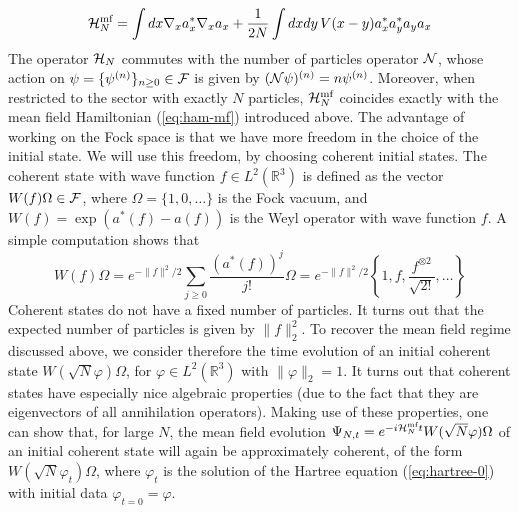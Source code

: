 \documentclass[11pt,a4paper]{article}
\newcommand{\bR}{{\mathbb R}}
\newcommand{\cF}{{\cal F}}
\newcommand{\cH}{{\cal H}}
\newcommand{\cN}{{\cal N}}
\begin{document}
\[ \cH^{\text{mf}}_N = \int dx \nabla_x a_x^* \nabla_x a_x + \frac{1}{2N} \int dxdy \, V(x-y) a_x^* a_y^*a_y a_x \]
The operator $\cH_N$ commutes with the number of particles operator $\cN$, whose action on $\psi = \{ \psi^{(n)} \}_{n\geq 0} \in \cF$ is given by $(\cN \psi)^{(n)} = n \psi^{(n)}$. Moreover, when restricted to the sector with exactly $N$ particles, $\cH^{\text{mf}}_N$ coincides exactly with the mean field Hamiltonian (\ref{eq:ham-mf}) introduced above. The advantage of working on the Fock space is that we have more freedom in the choice of the initial state. We will use this freedom, by choosing coherent initial states. The coherent state with wave function $f \in L^2 (\bR^3)$ is defined as the vector $W(f) \Omega \in \cF$, where $\Omega = \{ 1, 0, \dots \}$ is the Fock vacuum, and $W(f)= \exp (a^* (f) - a(f))$ is the Weyl operator with wave function $f$.  A simple computation shows that
\[ W(f) \Omega = e^{-\| f \|^2/2} \sum_{j \geq 0} \frac{(a^* (f))^j}{j!} \Omega = e^{-\|f \|^2/2} \left\{ 1, f , \frac{f^{\otimes 2}}{\sqrt{2!}} , \dots \right\} \]
Coherent states do not have a fixed number of particles. It turns out that the expected number of particles is given by $\| f \|_2^2$. To recover the mean field regime discussed above, we consider therefore the time evolution of an initial coherent state $W(\sqrt{N} \varphi) \Omega$, for $\varphi \in L^2 (\bR^3)$ with $\| \varphi \|_2 = 1$. It turns out that coherent states have especially nice algebraic properties (due to the fact that they are eigenvectors of all annihilation operators). Making use of these properties, one can show that, for large $N$, the mean field evolution $\Psi_{N,t} = e^{-i\cH^{\text{mf}}_N t} W(\sqrt{N} \varphi) \Omega$ of an initial coherent state will again be approximately coherent, of the form $W(\sqrt{N} \varphi_t) \Omega$, where $\varphi_t$ is the solution of the Hartree equation (\ref{eq:hartree-0}) with initial data $\varphi_{t=0} = \varphi$. 
\end{document}
